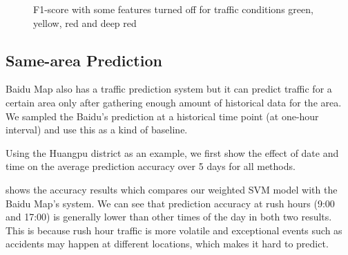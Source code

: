 \begin{figure}[th]
\begin{subfigure}[t]{0.495\columnwidth}
\end{subfigure}
\hfill
\begin{subfigure}[t]{0.495\columnwidth}
\end{subfigure}

\caption{F1-score with some features turned off for
traffic conditions green, yellow, red and deep red}
\label{fig:4colorF1}
\end{figure}


\subsection{Same-area Prediction}

Baidu Map also has a traffic prediction system but it can predict traffic for a certain area only
after gathering enough amount of historical data for the area. We sampled the Baidu's prediction at a historical time point (at one-hour interval) and use this as a kind of baseline.

Using the Huangpu district as an example, we first show the 
effect of date and time on the average prediction accuracy over 
5 days for all methods. 

 shows the accuracy results which compares our 
weighted SVM model with the Baidu Map's system. We can see that prediction accuracy at rush hours (9:00 and 17:00) is 
generally lower than other times of the day in both two results. This is because rush hour traffic is more volatile and 
exceptional events such as accidents may happen at different locations, 
which makes it hard to predict.

